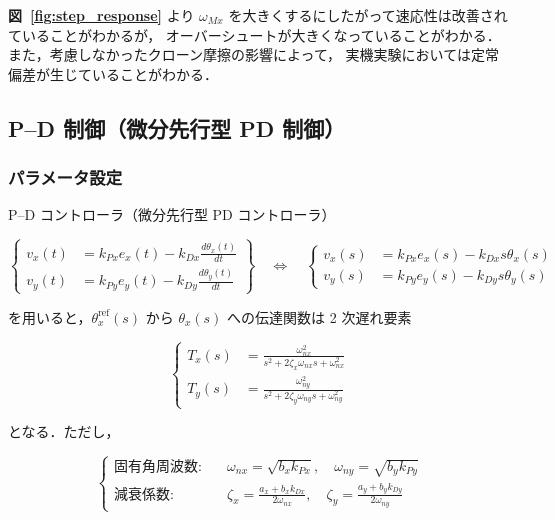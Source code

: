 \noindent
\textbf{図~\ref{fig:step_response}} より $\omega_{Mx}$ を大きくするにしたがって速応性は改善されていることがわかるが，
オーバーシュートが大きくなっていることがわかる．また，考慮しなかったクローン摩擦の影響によって，
実機実験においては定常偏差が生じていることがわかる．

\subsection{P--D 制御（微分先行型 PD 制御）}
\subsubsection{パラメータ設定}

P--D コントローラ（微分先行型 PD コントローラ）

\begin{equation}
\left\{
\begin{aligned}
    v_x(t) &= k_{Px} e_x(t) - k_{Dx} \frac{d\theta_x(t)}{dt} \\
    v_y(t) &= k_{Py} e_y(t) - k_{Dy} \frac{d\theta_y(t)}{dt}
\end{aligned}
\right\}
\quad \Longleftrightarrow \quad
\left\{
\begin{aligned}
    v_x(s) &= k_{Px} e_x(s) - k_{Dx} s \theta_x(s) \\
    v_y(s) &= k_{Py} e_y(s) - k_{Dy} s \theta_y(s)
\end{aligned}
\right.
\tag{5.7}
\end{equation}

を用いると，$\theta_x^{\text{ref}}(s)$ から $\theta_x(s)$ への伝達関数は 2 次遅れ要素

\begin{equation}
\left\{
\begin{aligned}
    T_x(s) &= \frac{\omega_{nx}^2}{s^2 + 2\zeta_x \omega_{nx}s + \omega_{nx}^2} \\
    T_y(s) &= \frac{\omega_{ny}^2}{s^2 + 2\zeta_y \omega_{ny}s + \omega_{ny}^2}
\end{aligned}
\right.
\tag{5.8}
\end{equation}

となる．ただし，

\begin{equation}
\left\{
\begin{aligned}
    \text{固有角周波数:} &\quad \omega_{nx} = \sqrt{b_x k_{Px}}, \quad \omega_{ny} = \sqrt{b_y k_{Py}} \\
    \text{減衰係数:} &\quad \zeta_x = \frac{a_x + b_x k_{Dx}}{2 \omega_{nx}}, \quad \zeta_y = \frac{a_y + b_y k_{Dy}}{2 \omega_{ny}}
\end{aligned}
\right.
\tag{5.9}
\end{equation}

